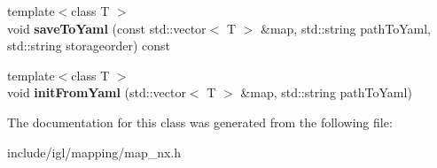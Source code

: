 \begin{DoxyCompactItemize}
{\footnotesize template$<$class T $>$ }\\void {\bfseries save\+To\+Yaml} (const std\+::vector$<$ T $>$ \&map, std\+::string path\+To\+Yaml, std\+::string storageorder) const
\item 
\mbox{\label{classnx_1_1map__nd_aea810f60ac469e04407541291a475aa8}} 
{\footnotesize template$<$class T $>$ }\\void {\bfseries init\+From\+Yaml} (std\+::vector$<$ T $>$ \&map, std\+::string path\+To\+Yaml)
\end{DoxyCompactItemize}


The documentation for this class was generated from the following file\+:\begin{DoxyCompactItemize}
\item 
include/igl/mapping/map\+\_\+nx.\+h\end{DoxyCompactItemize}
